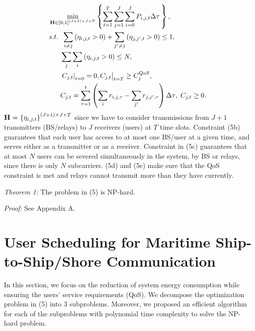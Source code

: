 \documentclass{ieeeaccess}
\begin{document}
\begin{subequations}
\begin{align}
& \mathop {\min }\limits_{{\mathbf{{\rm H}}} \in {{\left[ {0,1} \right]}^{\left( {J + 1} \right) \times J \times T}}} \left\{ {\sum\limits_{t = 1}^T {\sum\limits_{j = 1}^J {\sum\limits_{i = 0}^J {{P_{i,j,t}}\Delta \tau } \,} } } \right\} ,\\
& {s.t.} \;\; \sum\limits_{i \ne j} {\left( {{\eta _{i,j,t}} > 0} \right)}  + \sum\limits_{j' \ne j} {\left( {{\eta _{j,j',t}} > 0} \right) \le {1}} ,\\
& \;\;\;\;\;\; \sum\limits_j {\sum\limits_i {\left( {{\eta _{i,j,t}} > 0} \right)} }  \le N ,\\
& \;\;\;\;\;\; {\left. {{{\left. {{C_{j,t}}} \right|}_{t = 0}} = 0, {C_{j,t}}} \right|_{t = T}} \ge C_j^{QoS}, \\
& \;\;\;\;\;\; {C_{j,t}} = \sum\limits_{\tau  = 1}^t {\left( {\sum\limits_i {{r_{i,j,\tau }}}  - \sum\limits_{j'} {{r_{j,j',\tau }}} } \right)\Delta \tau } ,\; {C_{j,t}} \ge 0.
\end{align}
\end{subequations}
${\mathbf{{\rm H}}}{\text{ = }}{\left\{ {{\eta _{i,j,t}}} \right\}^{\left( {J + 1} \right) \times J \times T}}$ since we have to consider transmissions from ${J + 1}$ transmitters (BS/relays) to $J$ receivers (users) at $T$ time slots. 
Constraint (5b) guarantees that each user has access to at most one BS/user at a given time, and serves either as a transmitter or as a receiver. Constraint in (5c) guarantees that at most $N$ users can be severed simultaneously in the system, by BS or relays, since there is only $N$ subcarriers. (5d) and (5e) make sure that the QoS constraint is met and relays cannot transmit more than they have currently.

\textit{Theorem 1:} The problem in (5) is NP-hard.

\textit{Proof:} See Appendix A. 

\section{User Scheduling for Maritime Ship-to-Ship/Shore Communication}
In this section, we focus on the reduction of system energy consumption while ensuring the users' service requirements (QoS). We decompose the optimization problem in (5) into 3 subproblems. Moreover, we proposed an efficient algorithm for each of the subproblems with polynomial time complexity to solve the NP-hard problem.
\end{document}
